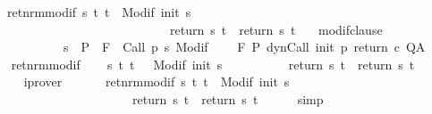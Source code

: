 \begin{isabellebody}
\ \ \ ret{\isacharunderscore}nrm{\isacharunderscore}modif{\isacharcolon}\ {\isachardoublequoteopen}{\isasymforall}s\ t{\isachardot}\ t\ {\isasymin}\ {\isacharparenleft}Modif\ {\isacharparenleft}init\ s{\isacharparenright}{\isacharparenright}\ \isanewline
\ \ \ \ \ \ \ \ \ \ \ \ \ \ \ \ \ \ \ \ \ \ \ \ \ \ \ \ {\isasymlongrightarrow}\ return{\isacharprime}\ s\ t\ {\isacharequal}\ return\ s\ t{\isachardoublequoteclose}\isanewline
\ \ \ modif{\isacharunderscore}clause{\isacharcolon}\ \isanewline
\ \ \ \ \ \ \ \ \ \ \ \ {\isachardoublequoteopen}{\isasymforall}s\ {\isasymin}\ P{\isachardot}\ {\isasymforall}{\isasymsigma}{\isachardot}\ {\isasymGamma}{\isacharcomma}{\isasymTheta}{\isasymturnstile}\isactrlbsub {\isacharslash}F\isactrlesub \ {\isacharbraceleft}{\isasymsigma}{\isacharbraceright}\ {\isacharparenleft}Call\ {\isacharparenleft}p\ s{\isacharparenright}{\isacharparenright}\ {\isacharparenleft}Modif\ {\isasymsigma}{\isacharparenright}{\isacharcomma}{\isacharbraceleft}{\isacharbraceright}{\isachardoublequoteclose}\isanewline
\ \ \ {\isachardoublequoteopen}{\isasymGamma}{\isacharcomma}{\isasymTheta}{\isasymturnstile}\isactrlbsub {\isacharslash}F\isactrlesub \ P\ {\isacharparenleft}dynCall\ init\ p\ return\ c{\isacharparenright}\ Q{\isacharcomma}A{\isachardoublequoteclose}\isanewline
%
\isadelimproof
%
\endisadelimproof
%
\isatagproof
{}\isamarkupfalse%
\ {\isacharminus}\isanewline
\ \ \isamarkupfalse%
\ ret{\isacharunderscore}nrm{\isacharunderscore}modif\isanewline
\ \ \isamarkupfalse%
\ {\isachardoublequoteopen}{\isasymforall}s\ t{\isachardot}\ t\ \ {\isasymin}\ {\isacharparenleft}Modif\ {\isacharparenleft}init\ s{\isacharparenright}{\isacharparenright}\ \isanewline
\ \ \ \ \ \ \ \ {\isasymlongrightarrow}\ return{\isacharprime}\ s\ t\ {\isacharequal}\ return\ s\ t{\isachardoublequoteclose}\isanewline
\ \ \ \ \isamarkupfalse%
\ iprover\isanewline
\ \ \isamarkupfalse%
\isanewline
\ \ \isamarkupfalse%
\ ret{\isacharunderscore}nrm{\isacharunderscore}modif{\isacharprime}{\isacharcolon}\ {\isachardoublequoteopen}{\isasymforall}s\ t{\isachardot}\ t\ {\isasymin}\ {\isacharparenleft}Modif\ {\isacharparenleft}init\ s{\isacharparenright}{\isacharparenright}\ \isanewline
\ \ \ \ \ \ \ \ \ \ \ \ \ \ \ \ \ \ \ \ \ \ {\isasymlongrightarrow}\ return{\isacharprime}\ s\ t\ {\isacharequal}\ return\ s\ t{\isachardoublequoteclose}\isanewline
\ \ \ \ \isamarkupfalse%
\ simp\isanewline
\ \ \isamarkupfalse%

\end{isabellebody}
